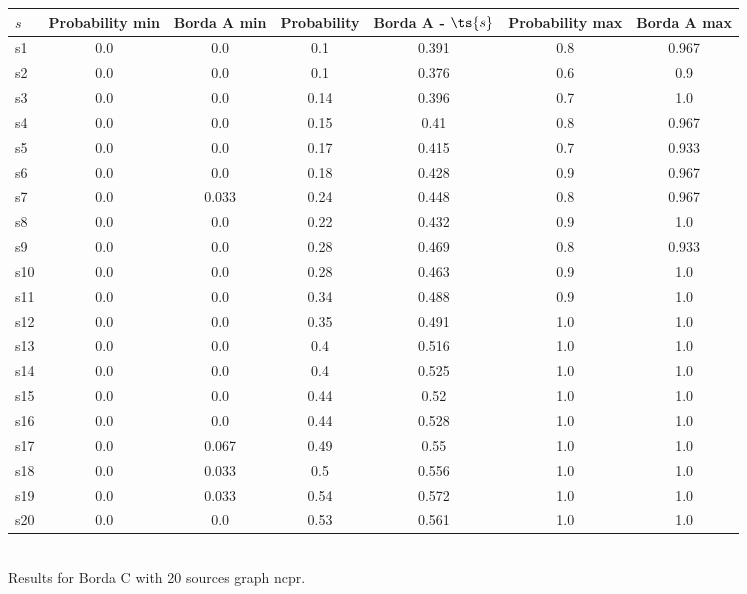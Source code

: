 \documentclass{article}
\begin{document}
\noindent\begin{tabular}{|l|c|c|c|c|c|c|}
\hline
$s$& Probability min & Borda A min & Probability & Borda A - $\ts{s}$ & Probability max & Borda A max\\
\hline
s1 &0.0 & 0.0 & 0.1 & 0.391 & 0.8 & 0.967\\
\hline
s2 &0.0 & 0.0 & 0.1 & 0.376 & 0.6 & 0.9\\
\hline
s3 &0.0 & 0.0 & 0.14 & 0.396 & 0.7 & 1.0\\
\hline
s4 &0.0 & 0.0 & 0.15 & 0.41 & 0.8 & 0.967\\
\hline
s5 &0.0 & 0.0 & 0.17 & 0.415 & 0.7 & 0.933\\
\hline
s6 &0.0 & 0.0 & 0.18 & 0.428 & 0.9 & 0.967\\
\hline
s7 &0.0 & 0.033 & 0.24 & 0.448 & 0.8 & 0.967\\
\hline
s8 &0.0 & 0.0 & 0.22 & 0.432 & 0.9 & 1.0\\
\hline
s9 &0.0 & 0.0 & 0.28 & 0.469 & 0.8 & 0.933\\
\hline
s10 &0.0 & 0.0 & 0.28 & 0.463 & 0.9 & 1.0\\
\hline
s11 &0.0 & 0.0 & 0.34 & 0.488 & 0.9 & 1.0\\
\hline
s12 &0.0 & 0.0 & 0.35 & 0.491 & 1.0 & 1.0\\
\hline
s13 &0.0 & 0.0 & 0.4 & 0.516 & 1.0 & 1.0\\
\hline
s14 &0.0 & 0.0 & 0.4 & 0.525 & 1.0 & 1.0\\
\hline
s15 &0.0 & 0.0 & 0.44 & 0.52 & 1.0 & 1.0\\
\hline
s16 &0.0 & 0.0 & 0.44 & 0.528 & 1.0 & 1.0\\
\hline
s17 &0.0 & 0.067 & 0.49 & 0.55 & 1.0 & 1.0\\
\hline
s18 &0.0 & 0.033 & 0.5 & 0.556 & 1.0 & 1.0\\
\hline
s19 &0.0 & 0.033 & 0.54 & 0.572 & 1.0 & 1.0\\
\hline
s20 &0.0 & 0.0 & 0.53 & 0.561 & 1.0 & 1.0\\
\hline
\end{tabular}\\

\noindent Results for Borda C with 20 sources graph ncpr.
\end{document}

